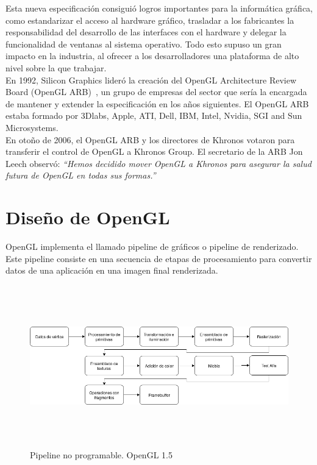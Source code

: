 Esta nueva especificación consiguió logros importantes para la informática gráfica,
como estandarizar el acceso al hardware gráfico, trasladar a los fabricantes la
responsabilidad del desarrollo de las interfaces con el hardware y delegar la
funcionalidad de ventanas al sistema operativo. Todo esto supuso un gran impacto
en la industria, al ofrecer a los desarrolladores una plataforma de alto nivel
sobre la que trabajar.\\

En 1992, Silicon Graphics lideró la creación del OpenGL Architecture Review
Board (OpenGL ARB)~\cite{OpenGLARB}, un grupo de empresas del sector que sería la encargada de
mantener y extender la especificación en los años siguientes. El OpenGL ARB
estaba formado por 3Dlabs, Apple, ATI, Dell, IBM, Intel, Nvidia, SGI and Sun
Microsystems.\\

En otoño de 2006, el OpenGL ARB y los directores de Khronos votaron para transferir el
control de OpenGL a Khronos Group. El secretario de la ARB Jon Leech observó:
\textit{``Hemos decidido mover OpenGL a Khronos para asegurar la salud futura de
OpenGL en todas sus formas.''}~\cite{OpenGLARB}

\section{Diseño de OpenGL}
\label{makereference2.3}

OpenGL implementa el llamado pipeline de gráficos o pipeline de renderizado. Este
pipeline consiste en una secuencia de etapas de procesamiento para convertir
datos de una aplicación en una imagen final renderizada. \\

\begin{figure}[h]
		\centering
		\includegraphics[height=7cm,width=\textwidth]{figures/pipelinefijo.png}
		\caption{Pipeline no programable. OpenGL 1.5}
		\label{fig2.1}
\end{figure}

